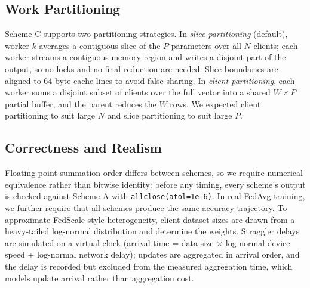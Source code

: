 \documentclass[conference]{IEEEtran}
\begin{document}
\subsection{Work Partitioning}
Scheme C supports two partitioning strategies. In \emph{slice partitioning} (default), worker $k$ averages a contiguous slice of the $P$ parameters over all $N$ clients; each worker streams a contiguous memory region and writes a disjoint part of the output, so no locks and no final reduction are needed. Slice boundaries are aligned to 64-byte cache lines to avoid false sharing. In \emph{client partitioning}, each worker sums a disjoint subset of clients over the full vector into a shared $W\times P$ partial buffer, and the parent reduces the $W$ rows. We expected client partitioning to suit large $N$ and slice partitioning to suit large $P$.

\subsection{Correctness and Realism}
Floating-point summation order differs between schemes, so we require numerical equivalence rather than bitwise identity: before any timing, every scheme's output is checked against Scheme A with \texttt{allclose(atol=1e-6)}. In real FedAvg training, we further require that all schemes produce the same accuracy trajectory. To approximate FedScale-style heterogeneity, client dataset sizes are drawn from a heavy-tailed log-normal distribution and determine the weights. Straggler delays are simulated on a virtual clock (arrival time = data size $\times$ log-normal device speed + log-normal network delay); updates are aggregated in arrival order, and the delay is recorded but excluded from the measured aggregation time, which models update arrival rather than aggregation cost.
\end{document}

